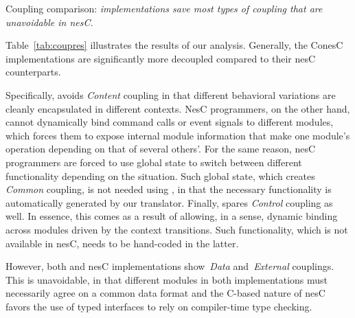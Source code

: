 \begin{table}[!tb]
\renewcommand{\arraystretch}{1.3}
\caption{Coupling comparison: \emph{\conesc implementations save most types of coupling that are unavoidable in nesC.}}
\label{tab:coupres}

\end{table}

 Table~\ref{tab:coupres} illustrates the results of our analysis. Generally,
the ConesC implementations are significantly more decoupled compared
to their nesC counterparts.

Specifically, \conesc avoids \emph{Content} coupling in that different
behavioral variations are cleanly encapsulated in different
contexts. NesC programmers, on the other hand, cannot dynamically bind
command calls or event signals to different modules, which forces them
to expose internal module information that make one module's operation
depending on that of several others'. For the same reason, nesC
programmers are forced to use global state to switch between different
functionality depending on the situation. Such global state, which
creates \emph{Common} coupling, is not needed using \conesc, in that
the necessary functionality is automatically generated by our
translator. Finally, \conesc spares \emph{Control} coupling as
well. In essence, this comes as a result of allowing, in a sense,
dynamic binding across modules driven by the context transitions. Such
functionality, which is not available in nesC, needs to be hand-coded
in the latter.




However, both \conesc and nesC implementations show~\emph{Data}
and~\emph{External} couplings. This is unavoidable, in that different
modules in both implementations must necessarily agree on a common
data format and the C-based nature of nesC favors the use of typed
interfaces to rely on compiler-time type checking.


